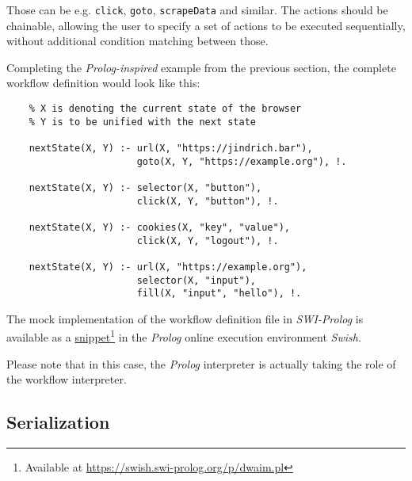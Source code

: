 Those can be e.g. \texttt{click}, \texttt{goto}, \texttt{scrapeData} and similar. 
The actions should be chainable, allowing the user to specify a set of actions to be executed sequentially, without additional condition matching between those.

Completing the \textit{Prolog-inspired} example from the previous section, the complete workflow definition would look like this:

\begin{minipage}{0.95\linewidth}
\begin{verbatim}
    % X is denoting the current state of the browser
    % Y is to be unified with the next state

    nextState(X, Y) :- url(X, "https://jindrich.bar"),
                       goto(X, Y, "https://example.org"), !.
    
    nextState(X, Y) :- selector(X, "button"),
                       click(X, Y, "button"), !.
    
    nextState(X, Y) :- cookies(X, "key", "value"),
                       click(X, Y, "logout"), !.
    
    nextState(X, Y) :- url(X, "https://example.org"),
                       selector(X, "input"),
                       fill(X, "input", "hello"), !.

\end{verbatim}
\end{minipage}

The mock implementation of the workflow definition file in \textit{SWI-Prolog} is available as a \href{https://swish.swi-prolog.org/p/dwaim.pl}{snippet}\footnote{Available at \url{https://swish.swi-prolog.org/p/dwaim.pl}} in the \textit{Prolog} online execution environment \textit{Swish}. 

Please note that in this case, the \textit{Prolog} interpreter is actually taking the role of the workflow interpreter.


\subsection{Serialization}

